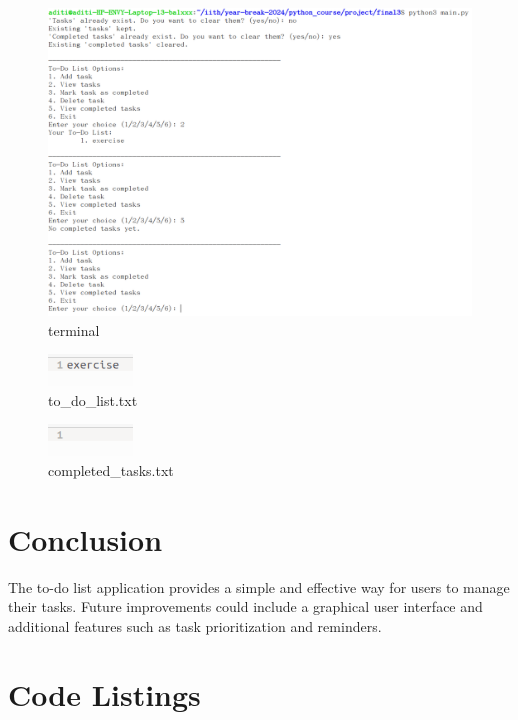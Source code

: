 \documentclass[12pt,a4paper]{report}
\begin{document}
\begin{figure}[htbp]
    \centering
    \includegraphics[width=1\textwidth]{./figs/4.png}
    \caption{terminal}
    \label{fig:ss4}
\end{figure}

\begin{figure}[htbp]
    \centering
    \includegraphics[width=0.2\textwidth]{./figs/a.png}
    \caption{to\_do\_list.txt}
    \label{fig:ssf1}
\end{figure}

\begin{figure}[htbp]
    \centering
    \includegraphics[width=0.2\textwidth]{./figs/b.png}
    \caption{completed\_tasks.txt}
    \label{fig:ssf2}
\end{figure}

\chapter{Conclusion}
The to-do list application provides a simple and effective way for users to manage their tasks. Future improvements could include a graphical user interface and additional features such as task prioritization and reminders.

\appendix
\chapter{Code Listings}
\end{document}
